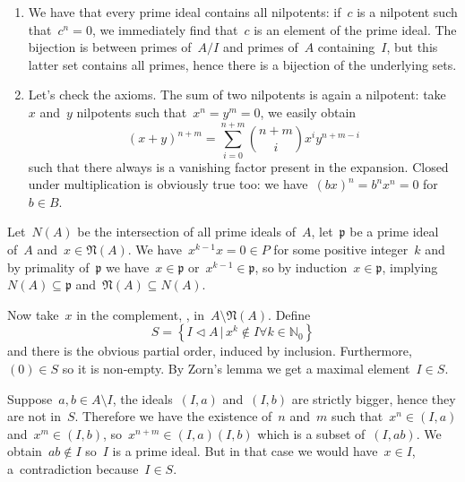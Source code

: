 \begin{exercise}
  \label{exercise:42o}
  \begin{enumerate}
    \item We have that every prime ideal contains all nilpotents: if~$c$ is a nilpotent such that~$c^n=0$, we immediately find that~$c$ is an element of the prime ideal. The bijection is between primes of~$A/I$ and primes of~$A$ containing~$I$, but this latter set contains all primes, hence there is a bijection of the underlying sets.

    \item\label{enumerate:42o-b} Let's check the axioms. The sum of two nilpotents is again a nilpotent: take~$x$ and~$y$ nilpotents such that~$x^n=y^m=0$, we easily obtain
      \begin{equation}
        (x+y)^{n+m}=\sum_{i=0}^{n+m}\binom{n+m}{i}x^iy^{n+m-i}
      \end{equation}
      such that there always is a vanishing factor present in the expansion. Closed under multiplication is obviously true too: we have~$(bx)^n=b^nx^n=0$ for~$b\in B$.
  \end{enumerate}
\end{exercise}

\begin{exercise}
  Let~$N(A)$ be the intersection of all prime ideals of~$A$, let~$\mathfrak{p}$ be a prime ideal of~$A$ and~$x\in\mathfrak{N}(A)$. We have~$x^{k-1}x=0\in P$ for some positive integer~$k$ and by primality of~$\mathfrak{p}$ we have~$x\in\mathfrak{p}$ or~$x^{k-1}\in\mathfrak{p}$, so by induction~$x\in\mathfrak{p}$, implying~$N(A)\subseteq\mathfrak{p}$ and~$\mathfrak{N}(A)\subseteq N(A)$.

  Now take~$x$ in the complement, \ie, in~$A\setminus\mathfrak{N}(A)$. Define
  \begin{equation}
    S=\left\{ I\triangleleft A\,|\,x^k\notin I\forall k\in\mathbb{N}_0 \right\}
  \end{equation}
  and there is the obvious partial order, induced by inclusion. Furthermore,~$(0)\in S$ so it is non-empty. By Zorn's lemma we get a maximal element~$I\in S$.

  Suppose~$a,b\in A\setminus I$, the ideals~$(I,a)$ and~$(I,b)$ are strictly bigger, hence they are not in~$S$. Therefore we have the existence of~$n$ and~$m$ such that~$x^n\in(I,a)$ and~$x^m\in(I,b)$, so~$x^{n+m}\in(I,a)(I,b)$ which is a subset of~$(I,ab)$. We obtain~$ab\notin I$ so~$I$ is a prime ideal. But in that case we would have~$x\in I$, a~contradiction because~$I\in S$.
\end{exercise}

